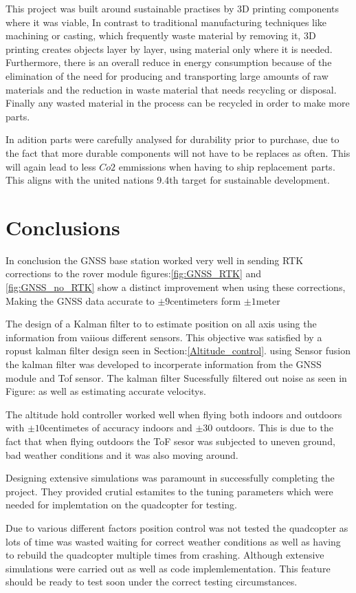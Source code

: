 \documentclass{report}
\begin{document}
This project was built around sustainable practises by 3D printing components where it was viable, In contrast to traditional manufacturing techniques like machining or casting, which frequently waste material by removing it, 3D printing creates objects layer by layer, using material only where it is needed. Furthermore, there is an overall reduce in energy consumption because of the elimination of the need for producing and transporting large amounts of raw materials and the reduction in waste material that needs recycling or disposal. Finally any wasted material in the process can be recycled in order to make more parts.

In adition parts were carefully analysed for durability prior to purchase, due to the fact that more durable components will not have to be replaces as often. This will again lead to less \(Co2\) emmissions when having to ship replacement parts. This aligns with the united nations 9.4th target for sustainable development\cite{un}.

\chapter{Conclusions}
In conclusion the GNSS base station worked very well in sending RTK corrections to the rover module figures:\ref{fig:GNSS_RTK} and \ref{fig:GNSS_no_RTK} show a distinct improvement when using these corrections, Making the GNSS data accurate to \(\pm9\)centimeters form \(\pm1\)meter

The design of a Kalman filter to to estimate
position on all axis using the information from vaiious different sensors. This objective was satisfied by a ropust  kalman filter design seen in Section:\ref{Altitude_control}. using Sensor fusion the kalman filter was developed to incorperate information from the GNSS module and Tof sensor. The kalman filter Sucessfully filtered out noise as seen in Figure: as well as estimating accurate velocitys.

The altitude hold controller worked well when flying both indoors and outdoors with \(\pm10\)centimetes of accuracy indoors and \(\pm30\) outdoors. This is due to the fact that when flying outdoors the ToF sesor was subjected to uneven ground, bad weather conditions and it was also moving around. 

Designing extensive simulations was paramount in successfully completing the project. They provided crutial estamites to the tuning parameters which were needed for implemtation on the quadcopter for testing.

Due to various different factors position control was not tested the quadcopter as lots of time was wasted waiting for correct weather conditions as well as having to rebuild the quadcopter multiple times from crashing. Although extensive simulations were carried out as well as code implemlementation. This feature should be ready to test soon under the correct testing circumstances.



\end{document}
